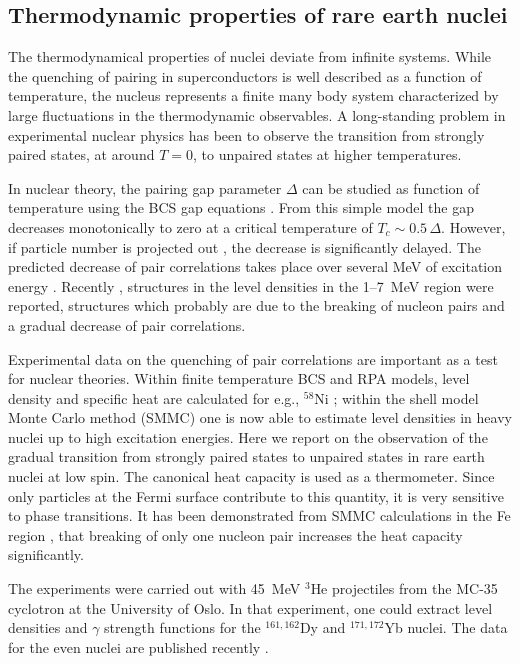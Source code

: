 \subsection{Thermodynamic properties of rare earth nuclei}
The thermodynamical properties of nuclei deviate from infinite systems. 
While the quenching of pairing in superconductors is well described as a 
function of temperature, the nucleus represents a finite many body system 
characterized by large fluctuations in the thermodynamic observables. A 
long-standing problem in experimental nuclear physics has been to observe the 
transition from strongly paired states, at around $T=0$, to unpaired states at 
higher temperatures. 

In nuclear theory, the pairing gap parameter $\Delta$ can be studied as 
function of temperature using the BCS gap equations \cite{SY63,Go81}. From this
simple model the gap decreases monotonically to zero at a critical temperature 
of $T_c\sim 0.5\,\Delta$. However, if particle number is projected out 
\cite{FS76,DK95}, the decrease is significantly delayed. The predicted decrease
of pair correlations takes place over several MeV of excitation energy 
\cite{DK95}. Recently \cite{MB99}, structures in the level 
densities in the 1--7~MeV region were reported, structures which 
probably are due to the breaking of 
nucleon pairs and a gradual decrease of pair correlations. 

Experimental data on the quenching of pair correlations are important as a 
test for nuclear theories. Within finite temperature BCS and RPA models, level 
density and specific heat are calculated for e.g., $^{58}$Ni \cite{Ng90}; 
within the shell model Monte Carlo method (SMMC) \cite{LJ93,KD97} one is now 
able to estimate level densities \cite{Or97} in heavy nuclei \cite{WK98} up to 
high excitation energies. 
Here we report on the observation of the gradual 
transition from strongly paired states to unpaired states in rare earth nuclei 
at low spin. The canonical heat capacity is used as a thermometer. Since only 
particles at the Fermi surface contribute to this quantity, it is very 
sensitive to phase transitions. It has been demonstrated from SMMC calculations
in the Fe region \cite{RH98,AL99,Al99}, that breaking of only one nucleon pair 
increases the heat capacity significantly. 

The experiments were carried out with 45~MeV $^3$He projectiles from the MC-35 
cyclotron at the University of Oslo. In that experiment, one could
extract level densities and $\gamma$
strength functions for the $^{161,162}$Dy and $^{171,172}$Yb nuclei. The data 
for the even nuclei are published recently \cite{MB99,schiller2001}.

